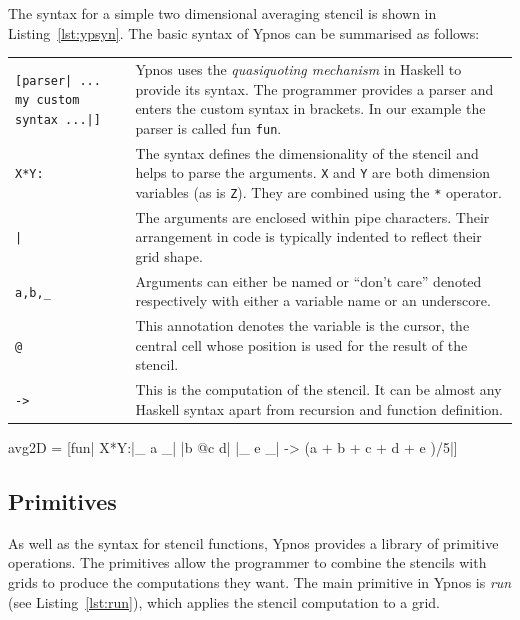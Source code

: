 \documentclass[12pt,a4paper,oneside]{scrbook}
\begin{document}
The syntax for a simple two dimensional averaging stencil is shown in
Listing~\ref{lst:ypsyn}. The basic syntax of Ypnos can be summarised as follows:

\begin{tabular}{p{} p{}}

\texttt{[parser| ... my custom syntax ...|]} & Ypnos uses the
\emph{quasiquoting mechanism} in Haskell to provide its syntax. The programmer
provides a parser and enters the custom syntax in brackets. In our example the
parser is called fun \texttt{fun}.  \\

\texttt{X*Y:} & The syntax defines the dimensionality of the stencil and helps
to parse the arguments. \texttt{X} and \texttt{Y} are both dimension variables
(as is \texttt{Z}). They are combined using the \texttt{*} operator.  \\

\texttt{|} & The arguments are enclosed within pipe characters.  Their
arrangement in code is typically indented to reflect their grid shape.  \\

\texttt{a,b,\_} & Arguments can either be named or ``don't care'' denoted
respectively with either a variable name or an underscore.  \\

\texttt{@} & This annotation denotes the variable is the cursor, the central
cell whose position is used for the result of the stencil.  \\

\texttt{->} & This is the computation of the stencil. It can be almost any
Haskell syntax apart from recursion and function definition.  \\

\end{tabular}

\begin{hflisting}[label={lst:ypsyn},caption={A simple mean function. Computes
    the mean of the neighbourhood of cells.}]
avg2D = [fun| X*Y:|_  a _|
                  |b @c d|
                  |_  e _| -> (a + b + c + d + e )/5|]
\end{hflisting}

\subsection{Primitives}

As well as the syntax for stencil functions, Ypnos provides a library of
primitive operations. The primitives allow the programmer to combine the
stencils with grids to produce the computations they want. The main primitive in
Ypnos is \emph{run} (see Listing~\ref{lst:run}), which applies the stencil
computation to a grid.
\end{document}

